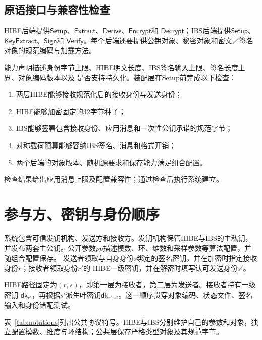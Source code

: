 \subsection{原语接口与兼容性检查}

HIBE后端提供$\mathsf{Setup}$、$\mathsf{Extract}$、$\mathsf{Derive}$、$\mathsf{Encrypt}$和
$\mathsf{Decrypt}$；IBS后端提供$\mathsf{Setup}$、$\mathsf{KeyExtract}$、$\mathsf{Sign}$和
$\mathsf{Verify}$。每个后端还要提供公钥对象、秘密对象和密文／签名对象的规范编码与加载方法。

能力声明描述身份字节上限、HIBE明文长度、IBS签名输入上限、签名长度上界、对象编码版本以及
是否支持持久化。装配层在Setup前完成以下检查：

\begin{enumerate}
  \item 两层HIBE能够接收规范化后的接收身份与发送身份；
  \item HIBE能够加密固定的32字节种子；
  \item IBS能够签署包含接收身份、应用消息和一次性公钥承诺的规范字节；
  \item 对称载荷预算能够容纳IBS签名、消息和格式开销；
  \item 两个后端的对象版本、随机源要求和保存能力满足组合配置。
\end{enumerate}

检查结果给出应用消息上限及配置兼容性；通过检查后执行系统建立。

\section{参与方、密钥与身份顺序}

系统包含可信发钥机构、发送方和接收方。发钥机构保管HIBE与IBS的主私钥，并发布两套主公钥。公开参数$pp$描述模数、环、维数和采样参数等算法配置，并随组合配置保存。
发送者领取与自身身份$s$绑定的签名密钥，并在加密时指定接收身份$r$；接收者领取身份$r'$的
HIBE一级密钥，并在解密时填写认可发送身份$s'$。

HIBE路径固定为$(r,s)$，即第一层为接收者，第二层为发送者。接收者持有一级密钥
$\mathsf{dk}_{r'}$，再根据$s'$派生叶密钥$\mathsf{dk}_{r',s'}$。这一顺序贯穿对象编码、状态文件、签名输入和身份错配测试。

表~\ref{tab:notations}列出公共协议符号。HIBE与IBS分别维护自己的参数和对象，独立配置模数、维度与环结构；公共层保存严格类型对象及其规范字节。

